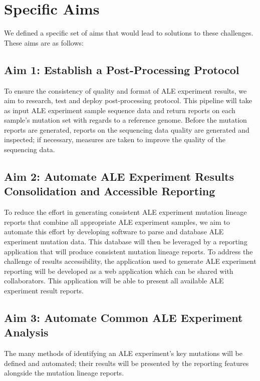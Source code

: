 \documentclass[12pt,final,masters,chapterheads]{ucsd}  %
\begin{document}
\section{Specific Aims}

We defined a specific set of aims that would lead to solutions to these challenges. These aims are as follows:
\subsection{Aim 1: Establish a Post-Processing Protocol}
To ensure the consistency of quality and format of ALE experiment results, we aim to research, test and deploy post-processing protocol. This pipeline will take as input ALE experiment sample sequence data and return reports on each sample's mutation set with regards to a reference genome. Before the mutation reports are generated, reports on the sequencing data quality are generated and inspected; if necessary, measures are taken to improve the quality of the sequencing data.
\subsection{Aim 2: Automate ALE Experiment Results Consolidation and Accessible Reporting}
To reduce the effort in generating consistent ALE experiment mutation lineage reports that combine all appropriate ALE experiment samples, we aim to automate this effort by developing software to parse and database ALE experiment mutation data. This database will then be leveraged by a reporting application that will produce consistent mutation lineage reports. To address the challenge of results accessibility, the application used to generate ALE experiment reporting will be developed as a web application which can be shared with collaborators. This application will be able to present all available ALE experiment result reports.
\subsection{Aim 3: Automate Common ALE Experiment Analysis}
%
%
The many methods of identifying an ALE experiment's key mutations will be defined and automated; their results will be presented by the reporting features alongside the mutation lineage reports.
\end{document}
